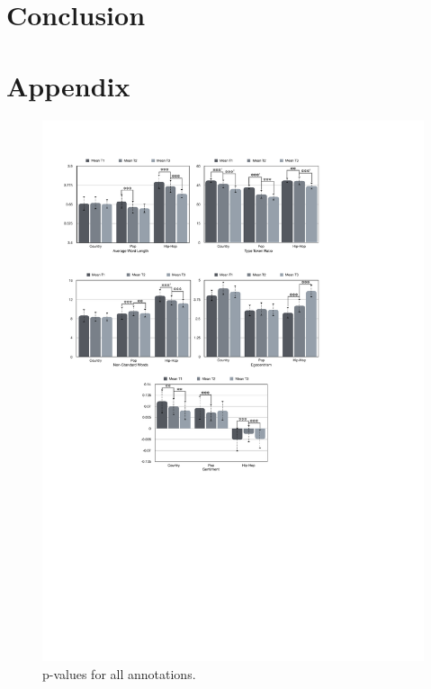 \documentclass[11pt,a4paper]{article}
\begin{document}
\section{Conclusion}\label{sec:conclusion}








\section*{Appendix}\label{sec:appendix}

\begin{figure}
\includegraphics[width=\textwidth]{all_pvals}
\caption{p-values for all annotations.}
\label{fig:pvals}
\end{figure}
\end{document}
